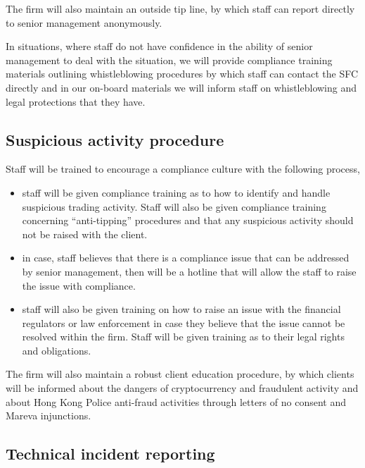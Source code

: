 The firm will also maintain an outside tip line, by which staff can
report directly to senior management anonymously.

In situations, where staff do not have confidence in the ability of
senior management to deal with the situation, we will provide
compliance training materials outlining whistleblowing procedures by
which staff can contact the SFC directly and in our on-board materials
we will inform staff on whistleblowing and legal protections that
they have.

\subsection{Suspicious activity procedure}

Staff will be trained to encourage a compliance culture with the
following process,
\begin{itemize}
  \item staff will be given compliance training as to how to identify
    and handle suspicious trading activity.  Staff will also be given
    compliance training concerning ``anti-tipping'' procedures and
    that any suspicious activity should not be raised with the client.
  \item in case, staff believes that there is a compliance issue that
    can be addressed by senior management, then will be a hotline that
    will allow the staff to raise the issue with compliance.
  \item staff will also be given training on how to raise an issue
    with the financial regulators or law enforcement in case they
    believe that the issue cannot be resolved within the firm.  Staff
    will be given training as to their legal rights and obligations.
\end{itemize}

The firm will also maintain a robust client education procedure, by
which clients will be informed about the dangers of cryptocurrency and
fraudulent activity and about Hong Kong Police anti-fraud activities
through letters of no consent and Mareva injunctions.

\subsection{Technical incident reporting}
\label{label:techincident}

